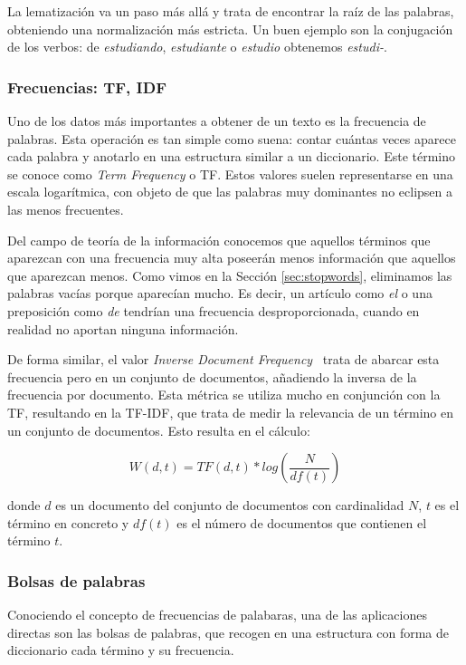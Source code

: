 La lematización va un paso más allá y trata de encontrar la raíz de las palabras, obteniendo una normalización más estricta. Un buen ejemplo son la conjugación de los verbos: de \textit{estudiando}, \textit{estudiante} o \textit{estudio} obtenemos \textit{estudi-}. \cite{Lemmatization2014} 


\subsubsection{Frecuencias: TF, IDF}
\label{sec:tfidf}
Uno de los datos más importantes a obtener de un texto es la frecuencia de palabras. Esta operación es tan simple como suena: contar cuántas veces aparece cada palabra y anotarlo en una estructura similar a un diccionario. Este término se conoce como \textit{Term Frequency} o TF. Estos valores suelen representarse en una escala logarítmica, con objeto de que las palabras muy dominantes no eclipsen a las menos frecuentes.

Del campo de teoría de la información \cite{information2001} conocemos que aquellos términos que aparezcan con una frecuencia muy alta poseerán menos información que aquellos que aparezcan menos. Como vimos en la  Sección \ref{sec:stopwords}, eliminamos las palabras vacías porque aparecían mucho. Es decir, un artículo como \textit{el} o una preposición como \textit{de} tendrían una frecuencia desproporcionada, cuando en realidad no aportan ninguna información. 


De forma similar, el valor \textit{Inverse Document Frequency}~\cite{Jones2004ASI} trata de abarcar esta frecuencia pero en un conjunto de documentos, añadiendo la inversa de la frecuencia por documento. Esta métrica se utiliza mucho en conjunción con la TF, resultando en la TF-IDF, que trata de medir la relevancia de un término en un conjunto de documentos. Esto resulta en el cálculo:

\begin{equation}
    W(d, t) = TF(d, t) * log(\frac{N}{df(t)})
\end{equation}

donde $d$ es un documento del conjunto de documentos con cardinalidad $N$, $t$ es el término en concreto y $df(t)$ es el número de documentos que contienen el término $t$.

\subsubsection{Bolsas de palabras}
Conociendo el concepto de frecuencias de palabaras, una de las aplicaciones directas son las bolsas de palabras, que recogen en una estructura con forma de diccionario cada término y su frecuencia.

